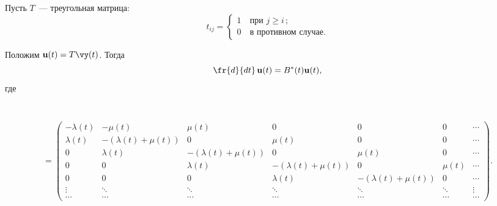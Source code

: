 Пусть  $T$~--- треугольная матрица:
$$
t_{ij}=\begin{cases}
1 &\ \mbox{при } j\ge i\,;\\
0 &\ \mbox{в~противном случае}.
\end{cases}
$$

Положим $\vu(t)=T\vy(t)$. Тогда
\begin{equation*}
\fr{d}{dt}\,\vu(t)= B^*(t)\vu(t), 
\end{equation*}
где

\vspace*{2pt}

\noindent 
{\small 
$$
\hspace*{-50mm}B^*(t) =\hspace*{55mm}
$$ 
\begin{eqnarray*}
 =  \left(
\begin{array}{ccccccc}
-\lambda(t)   & -\mu(t)                      & \mu(t)                       & 0  & 0 & 0 &\cdots\\
\lambda(t)   & -\left(\lambda(t)+\mu(t)\right) & 0                         & \mu(t)  & 0 & 0 &\cdots \\
0        & \lambda(t)                   & -\left(\lambda(t)+\mu(t)\right) & 0 & \mu(t)  & 0 & \cdots \\
0        & 0                         & \lambda(t)                   & -\left(\lambda(t)+\mu(t)\right)  & 0 & \mu(t) & \cdots\\
0        & 0                         & 0                         & \lambda(t) & -\left(\lambda(t)+\mu(t) \right)  & 0 & \cdots\\
\vdots & \ddots & \ddots & \ddots & \ddots & \ddots  & \vdots \\
\cdots & \cdots & \cdots & \cdots & \cdots & \cdots & \cdots
\end{array}
\right).
\end{eqnarray*}
}


